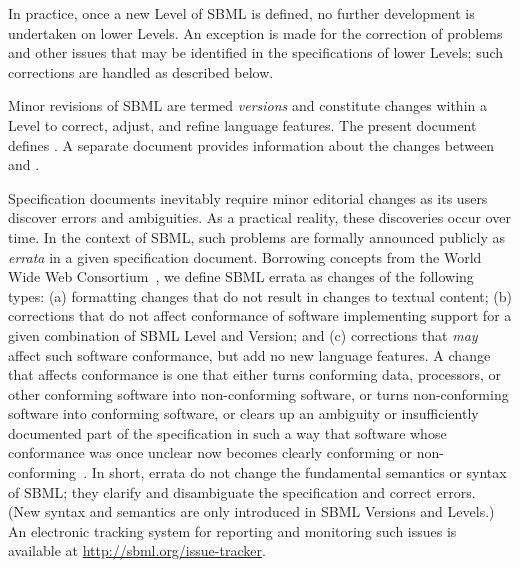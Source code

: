 In practice, once a new Level of SBML is defined, no further
development is undertaken on lower Levels.  An exception is made
for the correction of problems and other issues that may be
identified in the specifications of lower Levels; such corrections
are handled as described below.

Minor revisions of SBML are termed \emph{versions} and constitute
changes within a Level to correct, adjust, and refine language
features.  The present document defines \thisLV.  A separate
document provides information about the changes between \sbmlthree
and \sbmltwo.


Specification documents inevitably require minor editorial changes
as its users discover errors and ambiguities.  As a practical
reality, these discoveries occur over time.  In the context of
SBML, such problems are formally announced publicly as
\emph{errata} in a given specification document.  Borrowing
concepts from the World Wide Web Consortium~\citep{jacobs:2004},
we define SBML errata as changes of the following types: (a)
formatting changes that do not result in changes to textual
content; (b) corrections that do not affect conformance of
software implementing support for a given combination of SBML
Level and Version; and (c) corrections that \emph{may} affect such
software conformance, but add no new language features.  A change
that affects conformance is one that either turns conforming data,
processors, or other conforming software into non-conforming
software, or turns non-conforming software into conforming
software, or clears up an ambiguity or insufficiently documented
part of the specification in such a way that software whose
conformance was once unclear now becomes clearly conforming or
non-conforming~\citep{jacobs:2004}.  In short, errata do not
change the fundamental semantics or syntax of SBML; they clarify
and disambiguate the specification and correct errors.  (New
syntax and semantics are only introduced in SBML Versions and
Levels.)  An electronic tracking system for reporting and
monitoring such issues is available at
\url{http://sbml.org/issue-tracker}.

